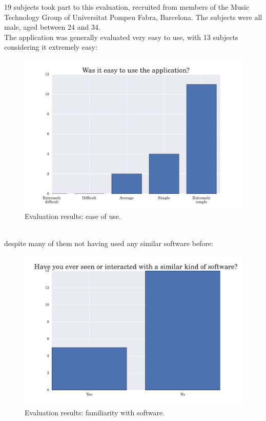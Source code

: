 19 subjects took part to this evaluation, recruited from members of the Music Technology Group of Universitat Pompeu Fabra, Barcelona. The subjects were all male, aged between 24 and 34. \\ \vspace{0.5cm}
The application was generally evaluated very easy to use, with 13 subjects considering it extremely easy: \\
\begin{figure}[h]
\begin{center}
\includegraphics[scale=0.7]{Figures/easytouse.pdf}
  \caption[Evaluation results: ease of use]{Evaluation results: ease of use.}
\end{center}
\end{figure}
\\
despite many of them not having used any similar software before: \\
\begin{figure}[h]
\begin{center}
\includegraphics[scale=0.52]{Figures/similarsoftware.pdf}
  \caption[Evaluation results: familiarity with software]{Evaluation results: familiarity with software.}
\end{center}
\end{figure}

